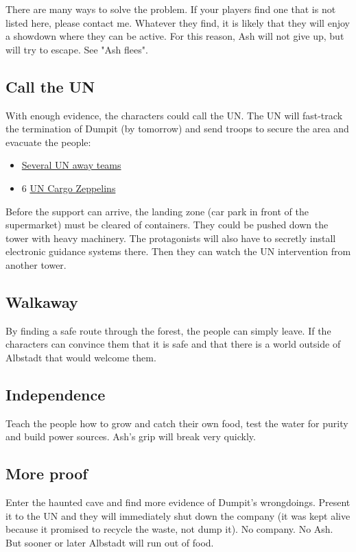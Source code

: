 There are many ways to solve the problem. If your players find one that is not listed here, please contact me. Whatever they find, it is likely that they will enjoy a showdown where they can be active. For this reason, Ash will not give up, but will try to escape. See "Ash flees".

\subsection{Call the UN}

With enough evidence, the characters could call the UN. The UN will fast-track the termination of Dumpit (by tomorrow) and send troops to secure the area and evacuate the people:

\begin{itemize}
    \item \hyperref[sec: UN away team]{Several UN away teams}
    \item 6 \hyperref[sec: UN Cargo Zeppelins]{UN Cargo Zeppelins}
\end{itemize}

Before the support can arrive, the landing zone (car park in front of the supermarket) must be cleared of containers. They could be pushed down the tower with heavy machinery. The protagonists will also have to secretly install electronic guidance systems there. Then they can watch the UN intervention from another tower.

\subsection{Walkaway}

By finding a safe route through the forest, the people can simply leave. If the characters can convince them that it is safe and that there is a world outside of Albstadt that would welcome them.

\subsection{Independence}

Teach the people how to grow and catch their own food, test the water for purity and build power sources. Ash's grip will break very quickly.

\subsection{More proof}

Enter the haunted cave and find more evidence of Dumpit's wrongdoings. Present it to the UN and they will immediately shut down the company (it was kept alive because it promised to recycle the waste, not dump it). No company. No Ash. But sooner or later Albstadt will run out of food.


